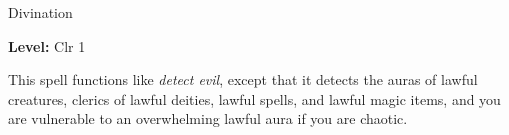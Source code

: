 
Divination

\textbf{Level:} Clr 1

This spell functions like \textit{detect evil}, except that it detects the auras 
of lawful creatures, clerics of lawful deities, lawful spells, and lawful magic 
items, and you are vulnerable to an overwhelming lawful aura if you are chaotic.

